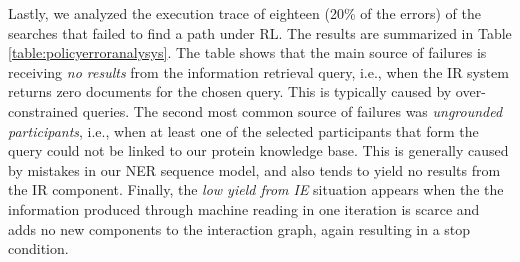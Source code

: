 Lastly, we analyzed the execution trace of eighteen (20\% of the errors) of the searches that failed to find a path under RL. 
The results are summarized in Table \ref{table:policyerroranalysys}. 
The table shows that the main source of failures is receiving \emph{no results} from the information retrieval query, i.e., when the IR system returns zero documents for the chosen query. This is typically caused by over-constrained queries.
The second most common source of failures was {\em ungrounded participants}, i.e., when at least one of the selected participants that form the query could not be linked to our protein knowledge base. This is generally caused by mistakes in our NER sequence model, and also tends to yield no results from the IR component.
Finally, the \emph{low yield from IE} situation appears when the the information produced through machine reading in one iteration is scarce and adds no new components to the interaction graph, again resulting in a stop condition.
